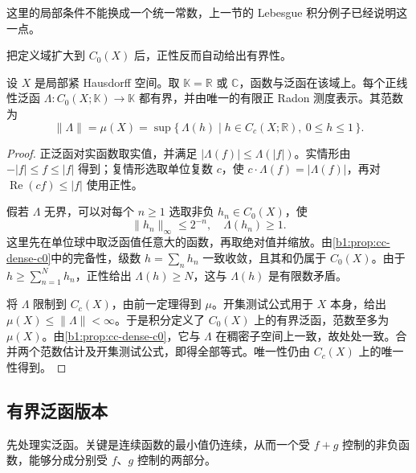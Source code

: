 这里的局部条件不能换成一个统一常数，上一节的 Lebesgue 积分例子已经说明这一点。

\ProseParagraphBreak

把定义域扩大到 \(C_0(X)\) 后，正性反而自动给出有界性。

\begin{corollary}\label{b1:cor:positive-c0-representation}
设 \(X\) 是局部紧 Hausdorff 空间。取 \(\mathbb K=\mathbb R\) 或 \(\mathbb C\)，函数与泛函在该域上。每个正线性泛函 \(\Lambda:C_0(X;\mathbb K)\rightarrow\mathbb K\) 都有界，并由唯一的有限正 Radon 测度表示。其范数为
\[
 \|\Lambda\|=\mu(X)
 =\sup\{\,\Lambda(h)\mid h\in C_c(X;\mathbb R),\ 0\leq h\leq1\,\}.
\]
\end{corollary}
\begin{proof}
正泛函对实函数取实值，并满足 \(|\Lambda(f)|\leq\Lambda(|f|)\)。实情形由 \(-|f|\leq f\leq|f|\) 得到；复情形选取单位复数 \(c\)，使 \(c\cdot \Lambda(f)=|\Lambda(f)|\)，再对 \(\operatorname{Re}(cf)\leq|f|\) 使用正性。

假若 \(\Lambda\) 无界，可以对每个 \(n\geq1\) 选取非负 \(h_n\in C_0(X)\)，使
\[
 \|h_n\|_\infty\leq2^{-n},\quad \Lambda(h_n)\geq1.
\]
这里先在单位球中取泛函值任意大的函数，再取绝对值并缩放。由\cref{b1:prop:cc-dense-c0}中的完备性，级数 \(h=\sum_nh_n\) 一致收敛，且其和仍属于 \(C_0(X)\)。由于 \(h\geq\sum_{n=1}^Nh_n\)，正性给出 \(\Lambda(h)\geq N\)，这与 \(\Lambda(h)\) 是有限数矛盾。

将 \(\Lambda\) 限制到 \(C_c(X)\)，由前一定理得到 \(\mu\)。开集测试公式用于 \(X\) 本身，给出 \(\mu(X)\leq\|\Lambda\|<\infty\)。于是积分定义了 \(C_0(X)\) 上的有界泛函，范数至多为 \(\mu(X)\)。由\cref{b1:prop:cc-dense-c0}，它与 \(\Lambda\) 在稠密子空间上一致，故处处一致。合并两个范数估计及开集测试公式，即得全部等式。唯一性仍由 \(C_c(X)\) 上的唯一性得到。
\end{proof}

\subsection{有界泛函版本}
\label{b1:subsec:110402}

先处理实泛函。关键是连续函数的最小值仍连续，从而一个受 \(f+g\) 控制的非负函数，能够分成分别受 \(f\)、\(g\) 控制的两部分。

